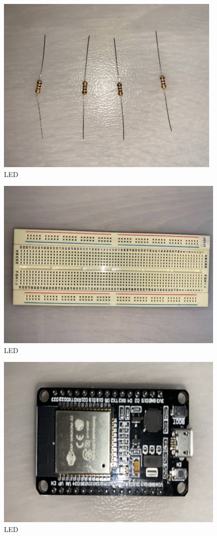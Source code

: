 \begin{figure}[htbp]
\centerline{\includegraphics{image3.png}}
\caption{LED}
\label{fig}
\end{figure}

\begin{figure}[htbp]
\centerline{\includegraphics{image4.png}}
\caption{LED}
\label{fig}
\end{figure}

\begin{figure}[htbp]
\centerline{\includegraphics{image5.png}}
\caption{LED}
\label{fig}
\end{figure}



